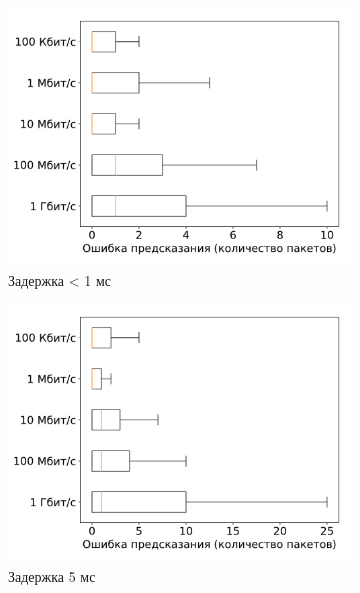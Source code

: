 \documentclass[../thesis.tex]{subfiles}
\begin{document}
\begin{figure}
\centering
\captionsetup{justification=centering,margin=2cm}
\begin{subfigure}[b]{0.49\textwidth}
  \centering
  \includegraphics[width=1.0\textwidth]{figures/experiments/packet_error_5.pdf}
  \caption{Задержка < 1 мс} \label{fig:prediction_error_1}
\end{subfigure}
\begin{subfigure}[b]{0.49\textwidth}
  \centering
  \includegraphics[width=1.0\textwidth]{figures/experiments/packet_error_10.pdf}
  \caption{Задержка 5 мс} \label{fig:prediction_error_5}
\end{subfigure}
\begin{subfigure}[b]{0.49\textwidth}

\end{subfigure}
\end{figure}
\end{document}
